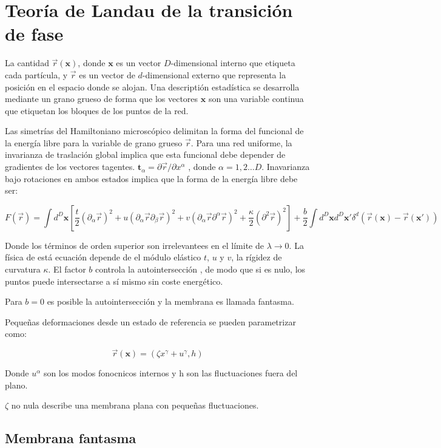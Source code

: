 \section{Teoría de Landau de la transición de fase}

La cantidad $\vec{r}(\boldsymbol{x})$, donde $\boldsymbol{x}$ es un vector
$D$-dimensional interno que etiqueta cada partícula, y $\vec{r}$ es un vector
de $d$-dimensional externo que representa la posición en el espacio donde se
alojan. Una descriptión estadística se desarrolla mediante un grano grueso de
forma que los vectores $\boldsymbol{x}$ son una variable continua que
etiquetan los bloques de los puntos de la red.

Las simetrías del Hamiltoniano microscópico delimitan la forma del funcional
de la energía libre para la variable de grano grueso $\vec{r}$. Para una red
uniforme, la invarianza de traslación global implica que esta funcional debe
depender de gradientes de los vectores tagentes.
$\boldsymbol{t}_{\alpha}=\partial \vec{r}/\partial x^{\alpha} $ , donde
$\alpha=1,2\dots D$. Inavarianza bajo rotaciones en ambos estados implica que
la forma de la energía libre debe ser:

\begin{equation}
F(\vec{r})=\int d^D\boldsymbol{x}
\left[
\frac{t}{2}(\partial_{\alpha}\vec{r})^2+
u(\partial_{\alpha}\vec{r}\partial_{\beta}\vec{r})^2+
v(\partial_{\alpha}\vec{r}\partial^{\alpha}\vec{r})^2+
\frac{\kappa}{2}(\partial^2\vec{r})^2
\right]
+\frac{b}{2}\int d^D\boldsymbol{x} d^D\boldsymbol{x'}
\delta^{d}(\vec{r}(\boldsymbol{x})-\vec{r}(\boldsymbol{x'}))
\end{equation}

Donde los términos de orden superior son irrelevantees en el límite de
$\lambda\rightarrow 0$. La física de está ecuación depende de el módulo
elástico $t$, $u$ y $v$, la rígidez de curvatura $\kappa$. El factor $b$
controla la autointersección , de modo que si es nulo, los puntos puede
intersectarse a sí mismo sin coste energético.

Para $b=0$ es posible la autointersección y la membrana es llamada fantasma.

Pequeñas deformaciones desde un estado de referencia se pueden parametrizar
como:

\begin{equation}
\vec{r}(\boldsymbol{x})=(\zeta x^{\gamma}+u^{\gamma},h)
\end{equation}

Donde $u^{\alpha}$ son los modos fonocnicos internos y h son las fluctuaciones
fuera del plano.

$\zeta$ no nula describe una membrana plana con pequeñas fluctuaciones.

\subsection{Membrana fantasma}



